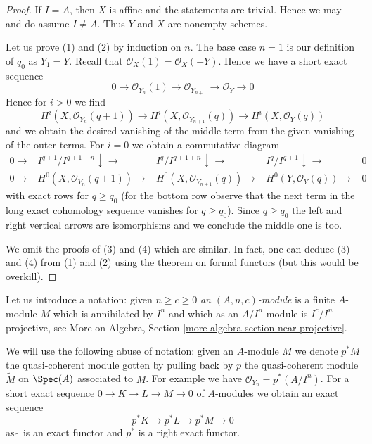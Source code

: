 \begin{proof}
If $I = A$, then $X$ is affine and the statements are trivial.
Hence we may and do assume $I \not = A$.
Thus $Y$ and $X$ are nonempty schemes.

\medskip\noindent
Let us prove (1) and (2) by induction on $n$. The base case $n = 1$
is our definition of $q_0$ as $Y_1 = Y$.
Recall that $\mathcal{O}_X(1) = \mathcal{O}_X(-Y)$.
Hence we have a short exact sequence
$$
0 \to \mathcal{O}_{Y_n}(1) \to \mathcal{O}_{Y_{n + 1}} \to \mathcal{O}_Y \to 0
$$
Hence for $i > 0$ we find
$$
H^i(X, \mathcal{O}_{Y_n}(q + 1)) \to
H^i(X, \mathcal{O}_{Y_{n + 1}}(q)) \to
H^i(X, \mathcal{O}_{Y}(q))
$$
and we obtain the desired vanishing of the middle term from the given
vanishing of the outer terms. For $i = 0$ we obtain a commutative diagram
$$
\begin{array}{ccccc}0 \longrightarrow & I^{q + 1}/I^{q + 1 + n} \downarrow\longrightarrow & I^q/I^{q + 1 + n} \downarrow\longrightarrow & I^q/I^{q + 1} \downarrow\longrightarrow & 0 \\ 0 \longrightarrow & H^0(X, \mathcal{O}_{Y_n}(q + 1)) \longrightarrow & H^0(X, \mathcal{O}_{Y_{n + 1}}(q)) \longrightarrow & H^0(Y, \mathcal{O}_Y(q)) \longrightarrow & 0\end{array}
$$
with exact rows for $q \geq q_0$ (for the bottom row observe that
the next term in the long exact cohomology sequence vanishes for
$q \geq q_0$). Since $q \geq q_0$ the left and right vertical arrows
are isomorphisms and we conclude the middle one is too.

\medskip\noindent
We omit the proofs of (3) and (4) which are similar.
In fact, one can deduce (3) and (4) from (1) and (2)
using the theorem on formal functors (but this would be
overkill).
\end{proof}

Let us introduce a notation: given $n \geq c \geq 0$
{\it an $(A, n, c)$-module}
is a finite $A$-module $M$ which is annihilated by $I^n$
and which as an $A/I^n$-module is $I^c/I^n$-projective, see
More on Algebra, Section \ref{more-algebra-section-near-projective}.

\medskip\noindent
We will use the following abuse of notation: given an $A$-module $M$
we denote $p^*M$ the quasi-coherent module gotten by pulling back by $p$
the quasi-coherent module $\widetilde{M}$ on $\Spec(A)$ associated to $M$.
For example we have $\mathcal{O}_{Y_n} = p^*(A/I^n)$.
For a short exact sequence $0 \to K \to L \to M \to 0$ of $A$-modules
we obtain an exact sequence
$$
p^*K \to p^*L \to p^*M \to 0
$$
as $\widetilde{\ }$ is an exact functor and $p^*$ is a right exact functor.

